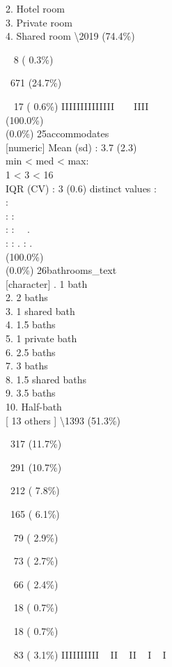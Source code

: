 \documentclass[
  journal,
]{IEEEtran}%
\begin{document}
2. Hotel room\\
3. Private room\\
4. Shared room \textbar\textbackslash2019 (74.4\%)\\
\strut ~ 8 ( 0.3\%)\\
\strut ~671 (24.7\%)\\
\strut ~ 17 ( 0.6\%) \textbar{} \textbar IIIIIIIIIIIIII ~ ~ IIII ~
\\
(100.0\%) \\
(0.0\%) \textbar{} \textbar{} 25\textbar accommodates\\
{[}numeric{]} \textbar Mean (sd) : 3.7 (2.3)\\
min \textless{} med \textless{} max:\\
1 \textless{} 3 \textless{} 16\\
IQR (CV) : 3 (0.6)  distinct values \textbar{} \textbar:\\
:\\
: :\\
: : ~~.\\
: : . : . \\
(100.0\%) \\
(0.0\%) \textbar{} \textbar{} 26\textbar bathrooms\_text\\
{[}character{]} . 1 bath\\
2. 2 baths\\
3. 1 shared bath\\
4. 1.5 baths\\
5. 1 private bath\\
6. 2.5 baths\\
7. 3 baths\\
8. 1.5 shared baths\\
9. 3.5 baths\\
10. Half-bath\\
{[} 13 others {]} \textbar\textbackslash1393 (51.3\%)\\
\strut ~317 (11.7\%)\\
\strut ~291 (10.7\%)\\
\strut ~212 ( 7.8\%)\\
\strut ~165 ( 6.1\%)\\
\strut ~ 79 ( 2.9\%)\\
\strut ~ 73 ( 2.7\%)\\
\strut ~ 66 ( 2.4\%)\\
\strut ~ 18 ( 0.7\%)\\
\strut ~ 18 ( 0.7\%)\\
\strut ~ 83 ( 3.1\%) \textbar{} \textbar IIIIIIIIII ~ II ~ II ~ I ~ I ~
\end{document}
